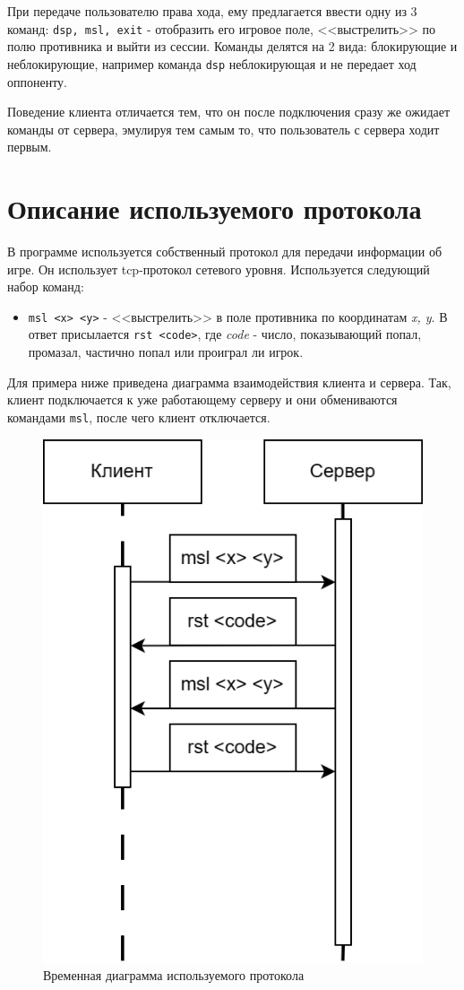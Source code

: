 При передаче пользователю права хода, ему предлагается ввести одну из 3 команд:
\texttt{dsp, msl, exit} - отобразить его игровое поле, <<выстрелить>> по полю
противника и выйти из сессии. Команды делятся на 2 вида: блокирующие и
неблокирующие, например команда \texttt{dsp} неблокирующая и не передает ход
оппоненту.

Поведение клиента отличается тем, что он после подключения сразу же ожидает
команды от сервера, эмулируя тем самым то, что пользователь с сервера ходит первым.

\newpage

\section*{Описание используемого протокола}

В программе используется собственный протокол для передачи информации об игре.
Он использует tcp-протокол сетевого уровня. Используется следующий набор
команд:

\begin{itemize}
    \item \texttt{msl <x> <y>} - <<выстрелить>> в поле противника по координатам
          \emph{x, y}. В ответ присылается \texttt{rst <code>}, где \emph{code}
          - число, показывающий попал, промазал, частично попал или проиграл ли игрок.
\end{itemize}

Для примера ниже приведена диаграмма взаимодействия клиента и сервера. Так,
клиент подключается к уже работающему серверу и они обмениваются командами
\texttt{msl}, после чего клиент отключается.

\begin{figure}[H]
    \centering
    \includegraphics[width=0.4\linewidth]{images/lab3_sequence.drawio.png}
    \caption{Временная диаграмма используемого протокола}
    \label{fig:sequence}
\end{figure}

